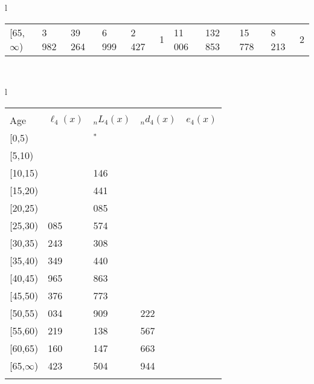 \documentclass[
]{article}
\begin{document}
\begin{table}
\begin{tabular}[t]{l}
\begin{tabular}
{}[65,$\infty$) & 3 982 & 39 264 & 6 999 & 2 427 & 1 & 11 006 & 132 853 & 15 778 & 8 213 & 2\\
\end{tabular}\\
\end{tabular}
\centering
\begin{tabular}[t]{l}
\hline
\begin{tabular}{>{\raggedright\arraybackslash}p{.43in}>{\raggedleft\arraybackslash}p{1.3in}>{\raggedleft\arraybackslash}p{1.3in}>{\raggedleft\arraybackslash}p{1.3in}>{\raggedleft\arraybackslash}p{1.3in}}
\toprule
\multicolumn{1}{c}{ } & \multicolumn{4}{c}{(4) Lost both} \\
\cmidrule(l{3pt}r{3pt}){2-5}
Age & $\ell_{4}(x)$ & ${}_nL_{4}(x)$ & ${}_nd_{4}(x)$ & $e_{4}(x)$\\
\midrule
{}[0,5) & 0 & 130$^{*}$ & 0 & 18\\
{}[5,10) & 67 & 592 & 0 & 18\\
{}[10,15) & 172 & 1 146 & 0 & 18\\
{}[15,20) & 408 & 3 441 & 4 & 18\\
{}[20,25) & 986 & 7 085 & 15 & 18\\
\addlinespace
{}[25,30) & 2 085 & 14 574 & 34 & 18\\
{}[30,35) & 3 243 & 24 308 & 69 & 18\\
{}[35,40) & 5 349 & 38 440 & 138 & 18\\
{}[40,45) & 7 965 & 58 863 & 275 & 18\\
{}[45,50) & 12 376 & 90 773 & 571 & 18\\
\addlinespace
{}[50,55) & 18 034 & 136 909 & 1 222 & 17\\
{}[55,60) & 28 219 & 192 138 & 2 567 & 16\\
{}[60,65) & 36 160 & 234 147 & 4 663 & 15\\
{}[65,$\infty$) & 42 423 & 953 504 & 58 944 & 13\\
\bottomrule
\multicolumn{5}{l}{\rule{0pt}{1em}\textsuperscript{*} Based on an estimated from SIPP with less than 10 respondents in the numerator.}\\
\end{tabular}\\
\end{tabular}
\end{table}
\end{document}
